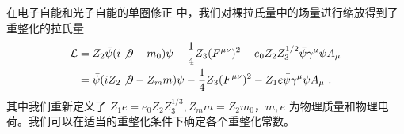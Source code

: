 

在电子自能和光子自能的单圈修正 中，我们对裸拉氏量中的场量进行缩放得到了重整化的拉氏量
\begin{equation}
\begin{aligned}
\mathcal{L} &= Z_2\bar\psi (i\not\partial - m_0)\psi - \frac{1}{4}Z_3 (F^{\mu\nu})^2-e_0Z_2Z_3^{1/2} \bar\psi \gamma^\mu\psi A_\mu\\
&=\bar\psi (iZ_2\not\partial - Z_m m)\psi - \frac{1}{4}Z_3 (F^{\mu\nu})^2-Z_1 e \bar\psi \gamma^\mu\psi A_\mu~.
\end{aligned}
\end{equation}
其中我们重新定义了 $Z_1e=e_0 Z_2 Z_3^{1/3},Z_m m=Z_2 m_0$，$m,e$ 为物理质量和物理电荷。我们可以在适当的重整化条件下确定各个重整化常数。

